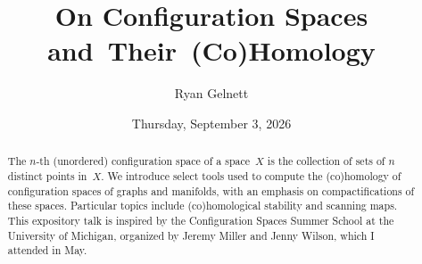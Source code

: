 \documentclass{UAmathtalk}
\author{Ryan Gelnett}
\title{On Configuration Spaces and~Their~(Co)Homology}
\date{Thursday, September 3, 2026}
\begin{document}
\maketitle

\begin{abstract}
The $n$-th (unordered) configuration space of a space~$X$ is the collection of sets of $n$ distinct points in~$X$. We introduce select tools used to compute the (co)homology of configuration spaces of graphs and manifolds, with an emphasis on compactifications of these spaces. Particular topics include (co)homological stability and scanning maps. This expository talk is inspired by the Configuration Spaces Summer School at the University of Michigan, organized by Jeremy Miller and Jenny Wilson, which I attended in May.
\end{abstract}
\end{document}
